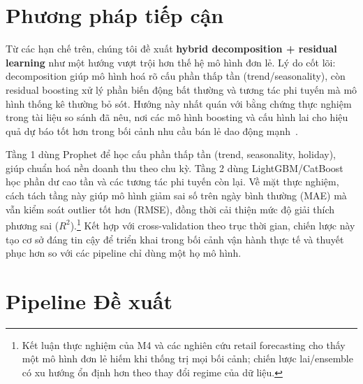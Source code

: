 \documentclass[10pt,twocolumn]{article}
\begin{document}
\section{Phương pháp tiếp cận}

Từ các hạn chế trên, chúng tôi đề xuất \textbf{hybrid decomposition +
residual learning} như một hướng vượt trội hơn thế hệ mô hình đơn lẻ.
Lý do cốt lõi: decomposition giúp mô hình hoá rõ cấu phần thấp tần
(trend/seasonality), còn residual boosting xử lý phần biến động bất
thường và tương tác phi tuyến mà mô hình thống kê thường bỏ sót. Hướng
này nhất quán với bằng chứng thực nghiệm trong tài liệu so sánh đã nêu,
nơi các mô hình boosting và cấu hình lai cho hiệu quả dự báo tốt hơn
trong bối cảnh nhu cầu bán lẻ dao động
mạnh~\cite{subashree2026,lightgbm,catboost,hybrid2022}.

Tầng 1 dùng Prophet để học cấu phần thấp tần (trend, seasonality,
holiday), giúp chuẩn hoá nền doanh thu theo chu kỳ. Tầng 2 dùng
LightGBM/CatBoost học phần dư cao tần và các tương tác phi tuyến còn
lại. Về mặt thực nghiệm, cách tách tầng này giúp mô hình giảm sai số
trên ngày bình thường (MAE) mà vẫn kiểm soát outlier tốt hơn (RMSE),
đồng thời cải thiện mức độ giải thích phương sai ($R^2$).\footnote{Kết luận thực nghiệm của M4 và các nghiên cứu retail forecasting cho thấy một mô hình đơn lẻ hiếm khi thống trị mọi bối cảnh; chiến lược lai/ensemble có xu hướng ổn định hơn theo thay đổi regime của dữ liệu.}
Kết hợp với
cross-validation theo trục thời gian, chiến lược này tạo cơ sở đáng tin
cậy để triển khai trong bối cảnh vận hành thực tế và thuyết phục hơn
so với các pipeline chỉ dùng một họ mô hình.

\section{Pipeline Đề xuất}
\end{document}
